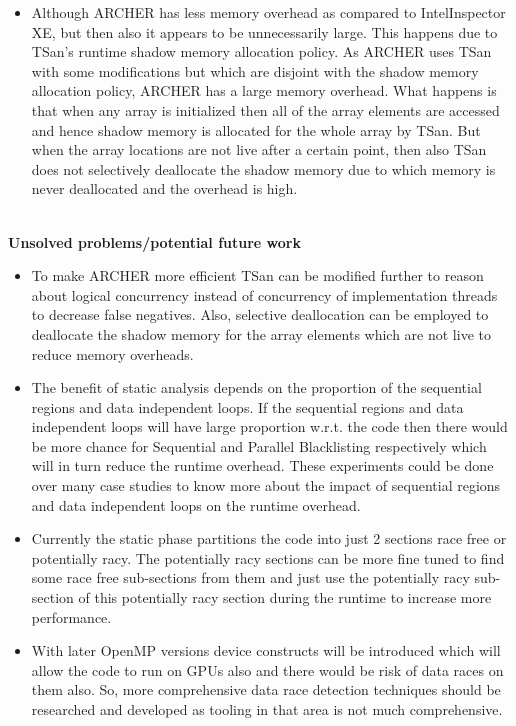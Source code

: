 \documentclass[20pt]{letter}
\begin{document}
\begin{enumerate}
{\begin{itemize}
    \item Although ARCHER has less memory overhead as compared to Intel\textregistered Inspector XE, but then also it appears to be unnecessarily large. This happens due to TSan's runtime shadow memory allocation policy. As ARCHER uses TSan with some modifications but which are disjoint with the shadow memory allocation policy, ARCHER has a large memory overhead. What happens is that when any array is initialized then all of the array elements are accessed and hence shadow memory is allocated for the whole array by TSan. But when the array locations are not live after a certain point, then also TSan does not selectively deallocate the shadow memory due to which memory is never deallocated and the overhead is high.  
\end{itemize}

\textbf{\\Unsolved problems/potential future work}\\
\begin{itemize}
    \item To make ARCHER more efficient TSan can be modified further to reason about logical concurrency instead of concurrency of implementation threads to decrease false negatives. Also, selective deallocation can be employed to deallocate the shadow memory for the array elements which are not live to reduce memory overheads.\\
    
    \item The benefit of static analysis depends on the proportion of the sequential regions and data independent loops. If the sequential regions and data independent loops will have large proportion w.r.t. the code then there would be more chance for Sequential and Parallel Blacklisting respectively which will in turn reduce the runtime overhead. These experiments could be done over many case studies to know more about the impact of sequential regions and data independent loops on the runtime overhead.\\

    \item Currently the static phase partitions the code into just 2 sections race free or potentially racy. The potentially racy sections can be more fine tuned to find some race free sub-sections from them and just use the potentially racy sub-section of this potentially racy section during the runtime to increase more performance.\\

    \item With later OpenMP versions device constructs will be introduced which will allow the code to run on GPUs also and there would be risk of data races on them also. So, more comprehensive data race detection techniques should be researched and developed as tooling in that area is not much comprehensive.\\    


\end{itemize}}
\end{enumerate}
\end{document}
